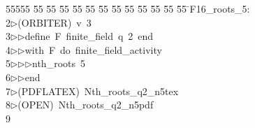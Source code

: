 %
%
\begin{tabbing}
55555 \= 55 \= 55 \= 55 \= 55 \= 55 \= 55 \= 55 \= 55 \= 55 \= 55 \= 55 \= 55 \= \>F16\_roots\_5:\\[0pt]
2\>$\triangleright$\>(ORBITER)\ v\ 3\ \\[0pt]
3\>$\triangleright$\>$\triangleright$\>define\ F\ finite\_field\ q\ 2\ end\ \\[0pt]
4\>$\triangleright$\>$\triangleright$\>with\ F\ do\ finite\_field\_activity\ \\[0pt]
5\>$\triangleright$\>$\triangleright$\>$\triangleright$\>nth\_roots\ 5\ \\[0pt]
6\>$\triangleright$\>$\triangleright$\>end\\[0pt]
7\>$\triangleright$\>(PDFLATEX)\ Nth\_roots\_q2\_n5tex\\[0pt]
8\>$\triangleright$\>(OPEN)\ Nth\_roots\_q2\_n5pdf\\[0pt]
9\>\end{tabbing}

